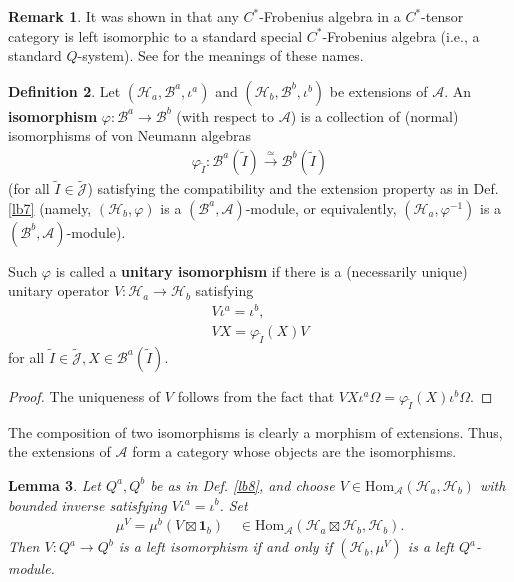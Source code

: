 \documentclass[11pt,b5paper,notitlepage]{article}
\theoremstyle{definition}
\newtheorem{df}{Definition}[section]
\newtheorem{rem}[df]{Remark}
\theoremstyle{plain}
\newtheorem{lm}[df]{Lemma}
\newcommand{\mc}{\mathcal}
\newcommand{\wtd}{\widetilde}
\newcommand{\id}{\mathbf{1}}
\newcommand{\Hom}{\mathrm{Hom}}
\newcommand{\Jtd}{\widetilde{\mathcal J}}
\numberwithin{equation}{section}
\begin{document}
\begin{rem}
It was shown in \cite[Thm. 2.9]{NY18} that any $C^*$-Frobenius algebra in a $C^*$-tensor category is left isomorphic to a standard special $C^*$-Frobenius algebra (i.e., a standard $Q$-system). See \cite{NY18} for the meanings of these names.
\end{rem}


\begin{df}
Let $(\mc H_a,\mc B^a,\iota^a)$ and $(\mc H_b,\mc B^b,\iota^b)$ be extensions of $\mc A$. An \textbf{isomorphism} $\varphi:\mc B^a\rightarrow\mc B^b$ (with respect to $\mc A$) is a collection of (normal) isomorphisms of von Neumann algebras 
\begin{align*}
\varphi_{\wtd I}:\mc B^a(\wtd I)\xrightarrow{\simeq}\mc B^b(\wtd I)	
\end{align*}
(for all $\wtd I\in\Jtd$) satisfying the compatibility and the extension property as in Def. \ref{lb7} (namely, $(\mc H_b,\varphi)$ is a $(\mc B^a,\mc A)$-module, or equivalently, $(\mc H_a,\varphi^{-1})$ is a $(\mc B^b,\mc A)$-module).

Such $\varphi$ is called a \textbf{unitary isomorphism} if there is a (necessarily unique) unitary operator $V:\mc H_a\rightarrow\mc H_b$ satisfying
\begin{gather}
V\iota^a=\iota^b,\\
V X=\varphi_{\wtd I}(X)V
\end{gather}
for all $\wtd I\in\Jtd,X\in\mc B^a(\wtd I)$.
\end{df}


\begin{proof}
The uniqueness of $V$ follows from the fact that $VX\iota^a\Omega=\varphi_{\wtd I}(X)\iota^b\Omega$.
\end{proof}


The composition of two isomorphisms is clearly a morphism of extensions. Thus, the extensions of $\mc A$ form a category whose objects are the isomorphisms.



\begin{lm}\label{lb10}
Let $Q^a,Q^b$ be as in Def. \ref{lb8}, and choose $V\in\Hom_{\mc A}(\mc H_a,\mc H_b)$ with bounded inverse satisfying $V\iota^a=\iota^b$. Set
\begin{align}
\mu^V=\mu^b(V\boxtimes\id_b)\quad \in\Hom_{\mc A}(\mc H_a\boxtimes\mc H_b,\mc H_b).
\end{align}
Then $V:Q^a\rightarrow Q^b$ is a left isomorphism if and only if $(\mc H_b,\mu^V)$ is a left $Q^a$-module.
\end{lm}
\end{document}
